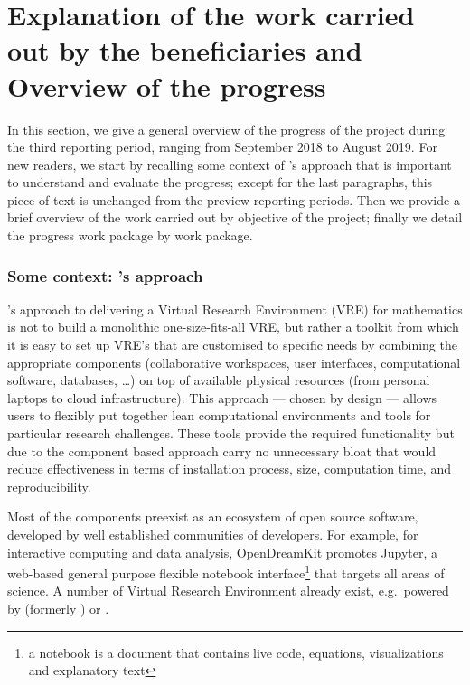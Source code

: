 \section{Explanation of the work carried out by the beneficiaries and Overview of the progress}

In this section, we give a general overview of the progress of the
project during the third reporting period, ranging from September 2018
to August 2019. For new readers, we start by recalling some context of
\ODK's approach that is important to understand and evaluate the
progress; except for the last paragraphs, this piece of text is
unchanged from the preview reporting periods. Then we provide a brief
overview of the work carried out by objective of the project; finally
we detail the progress work package by work package.

\subsubsection*{Some context: \ODK's approach}
\label{section.context}
\ODK's approach to delivering a Virtual Research Environment (VRE) for
mathematics is not to build a monolithic one-size-fits-all VRE, but
rather a toolkit from which it is easy to set up VRE's that are
customised to specific needs by combining the appropriate components
(collaborative workspaces, user interfaces, computational software,
databases, \dots) on top of available physical resources (from
personal laptops to cloud infrastructure). This approach --- chosen by
design --- allows users to flexibly put together lean computational
environments and tools for particular research challenges. These tools
provide the required functionality but due to the component based
approach carry no unnecessary bloat that would reduce effectiveness in
terms of installation process, size, computation time, and
reproducibility.

Most of the components preexist as an ecosystem of open source
software, developed by well established communities of developers. For
example, for interactive computing and data analysis, OpenDreamKit
promotes Jupyter, a web-based general purpose flexible notebook
interface\footnote{a notebook is a document that contains live code,
  equations, visualizations and explanatory text} that targets all
areas of science. A number of Virtual Research Environment already
exist, e.g.\ powered by \cocalc (formerly \SMC) or \JupyterHub.

